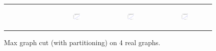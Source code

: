 \begin{figure}[ht]
\begin{tabular}{cccc}
\begin{subfigure}[b]{0.22\textwidth}
			\caption{}
			\label{appfig:partition:validated_CC2G_friendster_maxgraphcut}
	  \end{subfigure} &
	  \begin{subfigure}[b]{0.22\textwidth}
	  	\includegraphics[width=110pt]{images_partition/validated_CC2G_arabic2005_maxgraphcut.png}
			\caption{}
			\label{appfig:partition:validated_CC2G_arabic2005_maxgraphcut}
	  \end{subfigure} &
	  \begin{subfigure}[b]{0.22\textwidth}
	  	\includegraphics[width=110pt]{images_partition/validated_CC2G_uk2005_maxgraphcut.png}
			\caption{}
			\label{appfig:partition:validated_CC2G_uk2005_maxgraphcut}
	  \end{subfigure} &
	  \begin{subfigure}[b]{0.22\textwidth}
	  	\includegraphics[width=110pt]{images_partition/validated_CC2G_it2004_maxgraphcut.png}
			\caption{}
			\label{appfig:partition:validated_CC2G_it2004_maxgraphcut}
	  \end{subfigure} \\
  \end{tabular}
  \caption{Max graph cut (with partitioning) on 4 real graphs.}
\end{figure}






